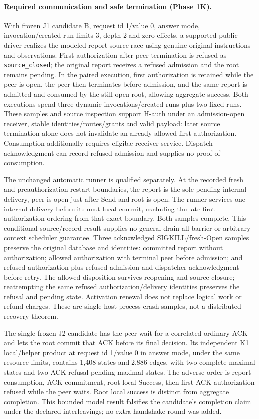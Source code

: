 \documentclass[11pt,a4paper]{article}
\theoremstyle{definition}
\theoremstyle{remark}
\begin{document}
\paragraph{Required communication and safe termination (Phase 1K).} With frozen J1 candidate B, request id 1/value 0, answer mode, invocation/created-run limits 3, depth 2 and zero effects, a supported public driver realizes the modeled report-source race using genuine original instructions and observations. First authorization after peer termination is refused as \texttt{source\_closed}; the original report receives a refused admission and the root remains pending. In the paired execution, first authorization is retained while the peer is open, the peer then terminates before admission, and the same report is admitted and consumed by the still-open root, allowing aggregate success. Both executions spend three dynamic invocations/created runs plus two fixed runs. These samples and source inspection support H-auth under an admission-open receiver, stable identities/routes/grants and valid payload: later source termination alone does not invalidate an already allowed first authorization. Consumption additionally requires eligible receiver service. Dispatch acknowledgment can record refused admission and supplies no proof of consumption.

The unchanged automatic runner is qualified separately. At the recorded fresh and preauthorization-restart boundaries, the report is the sole pending internal delivery, peer is open just after Send and root is open. The runner services one internal delivery before its next local commit, excluding the late-first-authorization ordering from that exact boundary. Both samples complete. This conditional source/record result supplies no general drain-all barrier or arbitrary-context scheduler guarantee. Three acknowledged SIGKILL/fresh-Open samples preserve the original database and identities: committed report without authorization; allowed authorization with terminal peer before admission; and refused authorization plus refused admission and dispatcher acknowledgment before retry. The allowed disposition survives reopening and source closure; reattempting the same refused authorization/delivery identities preserves the refusal and pending state. Activation renewal does not replace logical work or refund charges. These are single-host process-crash samples, not a distributed recovery theorem.

The single frozen J2 candidate has the peer wait for a correlated ordinary ACK and lets the root commit that ACK before its final decision. Its independent K1 local/helper product at request id 1/value 0 in answer mode, under the same resource limits, contains 1,408 states and 2,886 edges, with two complete maximal states and two ACK-refusal pending maximal states. The adverse order is report consumption, ACK commitment, root local Success, then first ACK authorization refused while the peer waits. Root local success is distinct from aggregate completion. This bounded model result falsifies the candidate's completion claim under the declared interleavings; no extra handshake round was added.
\end{document}
